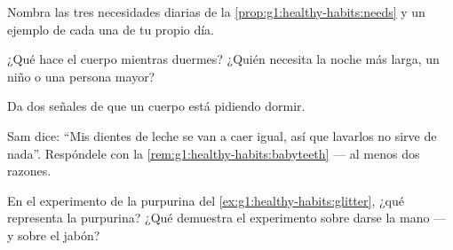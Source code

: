 \begin{exercise}[$\star$]\label{exo:g1:healthy-habits:6}
Nombra las tres necesidades diarias de la
\cref{prop:g1:healthy-habits:needs} y un ejemplo de cada una de tu
propio día.
\end{exercise}

\begin{exercise}[$\star$]\label{exo:g1:healthy-habits:7}
¿Qué hace el cuerpo mientras duermes? ¿Quién necesita la noche más
larga, un niño o una persona mayor?
\end{exercise}

\begin{exercise}[$\star$]\label{exo:g1:healthy-habits:8}
Da dos señales de que un cuerpo está pidiendo dormir.
\end{exercise}

\begin{exercise}[$\star\star$]\label{exo:g1:healthy-habits:9}
Sam dice: ``Mis dientes de leche se van a caer igual, así que lavarlos
no sirve de nada''. Respóndele con la
\cref{rem:g1:healthy-habits:babyteeth} --- al menos dos razones.
\end{exercise}

\begin{exercise}[$\star\star$]\label{exo:g1:healthy-habits:10}
En el experimento de la purpurina del
\cref{ex:g1:healthy-habits:glitter}, ¿qué representa la purpurina?
¿Qué demuestra el experimento sobre darse la mano --- y sobre el jabón?
\end{exercise}
